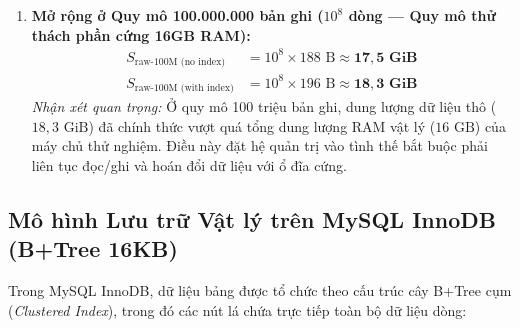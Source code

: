 \begin{enumerate}
  \item \textbf{Mở rộng ở Quy mô 100.000.000 bản ghi ($10^8$ dòng --- Quy mô thử thách phần cứng 16GB RAM):}
  \begin{align}
    S_{\text{raw-100M (no index)}}   &= 10^8 \times 188\text{ B} \approx \mathbf{17,5\text{ GiB}}\\
    S_{\text{raw-100M (with index)}} &= 10^8 \times 196\text{ B} \approx \mathbf{18,3\text{ GiB}}
  \end{align}
  \textit{Nhận xét quan trọng:} Ở quy mô 100 triệu bản ghi, dung lượng dữ liệu thô ($18,3\text{ GiB}$) đã chính thức vượt quá tổng dung lượng RAM vật lý ($16\text{ GB}$) của máy chủ thử nghiệm. Điều này đặt hệ quản trị vào tình thế bắt buộc phải liên tục đọc/ghi và hoán đổi dữ liệu với ổ đĩa cứng.
\end{enumerate}

\subsection{Mô hình Lưu trữ Vật lý trên MySQL InnoDB (B+Tree 16KB)}

Trong MySQL InnoDB, dữ liệu bảng được tổ chức theo cấu trúc cây B+Tree cụm (\textit{Clustered Index}), trong đó các nút lá chứa trực tiếp toàn bộ dữ liệu dòng:

